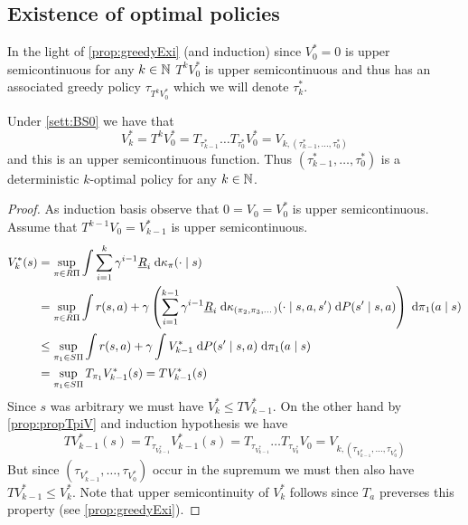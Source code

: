 \subsection{Existence of optimal policies}

In the light of \cref{prop:greedyExi} (and induction)
since $V_0^* = 0$ is upper semicontinuous for any $k \in \mathbb{N}$
$T^k V^*_0$ is upper semicontinuous and thus has an associated greedy
policy $\tau_{T^k V^*_0}$ which we will denote $\tau^*_k$.

\begin{prop}
  Under \cref{sett:BS0} we have that
  \[ V^*_k = T^k V_0^* = T_{\tau^*_{k-1}} \dots T_{\tau^*_0} V_0^*
  = V_{k, (\tau^*_{k-1}, \dots, \tau^*_0)} \]
  and this is an upper semicontinuous function.
  Thus $(\tau^*_{k-1}, \dots, \tau^*_0)$ is a deterministic
  $k$-optimal policy for any $k \in \mathbb{N}$.
  \label{prop:kOpt}
\end{prop}
\begin{proof}
  As induction basis observe that $0 = V_0 = V_0^*$ is upper semicontinuous.
  Assume that $T^{k-1} V_0 = V^*_{k-1}$ is upper semicontinuous.
  \begin{align*}
    V^*_k(s) &= \sup_{\pi \in R\Pi} \int \sum_{i=1}^k \gamma^{i-1}
    \underline{R}_i \; \mathrm{d} \kappa_\pi(\cdot \mid s)
    \\ &= \sup_{\pi \in R\Pi} \int r(s, a) + \gamma \left(
      \sum_{i=1}^{k-1} \gamma^{i-1} \underline{R}_i \; \mathrm{d}
      \kappa_{(\pi_2, \pi_3, \dots)}(\cdot \mid s, a, s')
    \; \mathrm{d} P(s' \mid s, a) \right) \; \mathrm{d} \pi_1(a \mid s)
    \\ &\leq \sup_{\pi_1 \in S\Pi} \int r(s, a) + \gamma \int V^*_{k-1}
    \; \mathrm{d} P(s' \mid s, a) \; \mathrm{d} \pi_1(a \mid s)
    \\ &= \sup_{\pi_1 \in S\Pi} T_{\pi_1} V^*_{k-1}(s) = T V^*_{k-1}(s) 
  \end{align*}
  Since $s$ was arbitrary we must have $V_k^* \leq TV_{k-1}^*$.
  On the other hand by \cref{prop:propTpiV} and induction hypothesis we have
  \[T V^*_{k-1}(s) = T_{\tau_{V^*_{k-1}}} V^*_{k-1}(s)
    = T_{\tau_{V^*_{k-1}}} \dots T_{\tau_{V^*_0}} V_0
  = V_{k, (\tau_{V^*_{k-1}}, \dots, \tau_{V^*_0})} \]
  But since $(\tau_{V^*_{k-1}}, \dots, \tau_{V^*_0})$ occur in the supremum
  we must then also have $TV_{k-1}^* \leq V^*_k$.
  Note that upper semicontinuity of $V^*_k$ follows since $T_a$ preverses
  this property (see \cref{prop:greedyExi}).
\end{proof}

